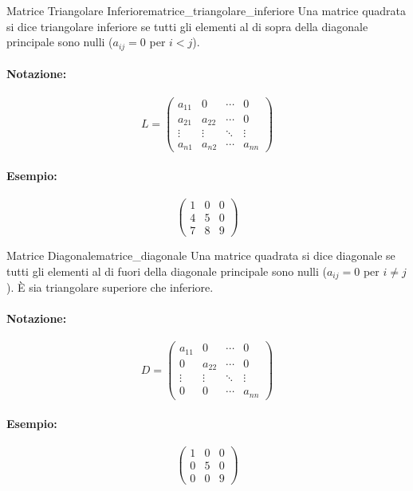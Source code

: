 \documentclass{article}
\begin{document}
\begin{definition}{Matrice Triangolare Inferiore}{matrice_triangolare_inferiore}
Una matrice quadrata si dice triangolare inferiore se tutti gli elementi al di sopra della diagonale principale sono nulli ($a_{ij} = 0$ per $i<j$).
\paragraph{Notazione:}
\[ L = \begin{pmatrix}
a_{11} & 0 & \cdots & 0 \\
a_{21} & a_{22} & \cdots & 0 \\
\vdots & \vdots & \ddots & \vdots \\
a_{n1} & a_{n2} & \cdots & a_{nn}
\end{pmatrix} \]
\paragraph{Esempio:}
\[ \begin{pmatrix}
1 & 0 & 0 \\
4 & 5 & 0 \\
7 & 8 & 9
\end{pmatrix} \]
\end{definition}

\begin{definition}{Matrice Diagonale}{matrice_diagonale}
Una matrice quadrata si dice diagonale se tutti gli elementi al di fuori della diagonale principale sono nulli ($a_{ij} = 0$ per $i \neq j$). È sia triangolare superiore che inferiore.
\paragraph{Notazione:}
\[ D = \begin{pmatrix}
a_{11} & 0 & \cdots & 0 \\
0 & a_{22} & \cdots & 0 \\
\vdots & \vdots & \ddots & \vdots \\
0 & 0 & \cdots & a_{nn}
\end{pmatrix} \]
\paragraph{Esempio:}
\[ \begin{pmatrix}
1 & 0 & 0 \\
0 & 5 & 0 \\
0 & 0 & 9
\end{pmatrix} \]
\end{definition}
\end{document}
